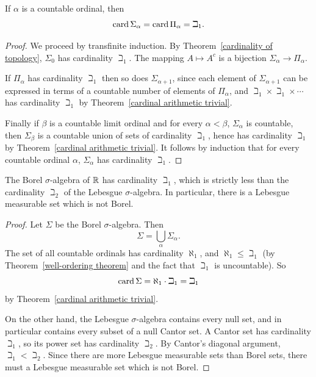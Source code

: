 \begin{lemma}
If $\alpha$ is a countable ordinal, then
$$\operatorname{card} \Sigma_{\alpha} = \operatorname{card} \Pi_{\alpha} = \beth_{1}.$$
\end{lemma}
\begin{proof}
We proceed by transfinite induction.
By Theorem~\ref{cardinality of topology}, $\Sigma_{0}$ has cardinality $\beth_{1}$.
The mapping $A \mapsto A^{c}$ is a bijection $\Sigma_{\alpha} \to \Pi_{\alpha}$.

If $\Pi_{\alpha}$ has cardinality $\beth_{1}$ then so does $\Sigma_{\alpha+1}$, since each element of $\Sigma_{\alpha+1}$ can be expressed in terms of a countable number of elements of $\Pi_{\alpha}$, and $\beth_{1} \times \beth_{1} \times \cdots$ has cardinality $\beth_{1}$ by Theorem~\ref{cardinal arithmetic trivial}.

Finally if $\beta$ is a countable limit ordinal and for every $\alpha < \beta$, $\Sigma_{\alpha}$ is countable, then $\Sigma_{\beta}$ is a countable union of sets of cardinality $\beth_{1}$, hence has cardinality $\beth_{1}$ by Theorem~\ref{cardinal arithmetic trivial}.
It follows by induction that for every countable ordinal $\alpha$, $\Sigma_{\alpha}$ has cardinality $\beth_{1}$.
\end{proof}

\begin{theorem}\label{Borel not Lebesgue}
The Borel $\sigma$-algebra of $\mathbb{R}$ has cardinality $\beth_{1}$, which is strictly less than the cardinality $\beth_{2}$ of the Lebesgue $\sigma$-algebra.
In particular, there is a Lebesgue measurable set which is not Borel.
\end{theorem}
\begin{proof}
Let $\Sigma$ be the Borel $\sigma$-algebra. Then
$$\Sigma = \bigcup_{\alpha} \Sigma_{\alpha}.$$
The set of all countable ordinals has cardinality $\aleph_{1}$, and $\aleph_{1} \leq \beth_{1}$ (by Theorem~\ref{well-ordering theorem} and the fact that $\beth_{1}$ is uncountable).
So
$$\operatorname{card} \Sigma = \aleph_{1} \cdot \beth_{1} = \beth_{1}$$
by Theorem~\ref{cardinal arithmetic trivial}.

On the other hand, the Lebesgue $\sigma$-algebra contains every null set, and in particular contains every subset of a null Cantor set.
A Cantor set has cardinality $\beth_{1}$, so its power set has cardinality $\beth_{2}$.
By Cantor's diagonal argument, $\beth_{1} < \beth_{2}$.
Since there are more Lebesgue measurable sets than Borel sets, there must a Lebesgue measurable set which is not Borel.
\end{proof}

